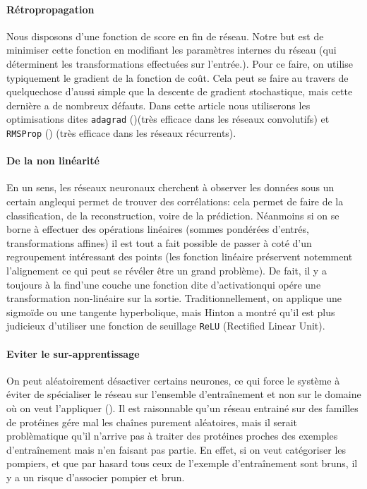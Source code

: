 \documentclass[a4paper, 11pt, onecolumn]{article}
\begin{document}
\paragraph{Rétropropagation}

Nous disposons d'une fonction de score en fin de réseau. Notre but est de
minimiser cette fonction en modifiant les paramètres internes du réseau (qui
déterminent les transformations effectuées sur l'entrée.). Pour ce faire, on
utilise typiquement le gradient de la fonction de coût. Cela peut se faire au
travers de quelquechose d'aussi simple que la descente de gradient stochastique, mais cette
dernière a de nombreux défauts. Dans cette article nous utiliserons les
optimisations dites \texttt{adagrad} (\cite{duchi2011adaptive})(très efficace dans les réseaux
convolutifs) et \texttt{RMSProp} (\cite{hintonlecture}) (très efficace dans les réseaux récurrents).

\paragraph{De la non linéarité}

En un sens, les réseaux neuronaux cherchent à observer les données \og sous un
certain angle\fg qui permet de trouver des corrélations: cela permet de faire de
la classification, de la reconstruction, voire de la prédiction. Néanmoins si on
se borne à effectuer des opérations linéaires (sommes pondérées
d'entrés, transformations affines) il est tout a fait possible de passer à coté
d'un regroupement intéressant des points (les fonction linéaire préservent
notemment l'alignement ce qui peut se révéler être un grand problème). De fait,
il y a toujours \og à la fin\fg d'une couche une fonction dite \og
d'activation\fg qui opére une transformation non-linéaire sur la sortie.
Traditionnellement, on applique une sigmoïde ou une tangente hyperbolique, mais
Hinton a montré qu'il est plus judicieux d'utiliser une fonction de seuillage
\texttt{ReLU} (Rectified Linear Unit).

\paragraph{Eviter le sur-apprentissage}
  
On peut aléatoirement désactiver certains neurones, ce qui force le système à
 éviter de spécialiser le réseau sur l'ensemble d'entraînement et non sur
le domaine où on veut l'appliquer (\cite{srivastava2014dropout}). Il est raisonnable qu'un réseau
entrainé sur des familles de protéines gére mal les chaînes purement
aléatoires, mais il serait problèmatique qu'il n'arrive pas à
traiter des protéines proches des exemples d'entraînement mais n'en faisant
pas partie. En effet, si on veut catégoriser les pompiers, et que par hasard
tous ceux de l'exemple d'entraînement sont bruns, il y a un risque d'associer
pompier et brun.
\end{document}
